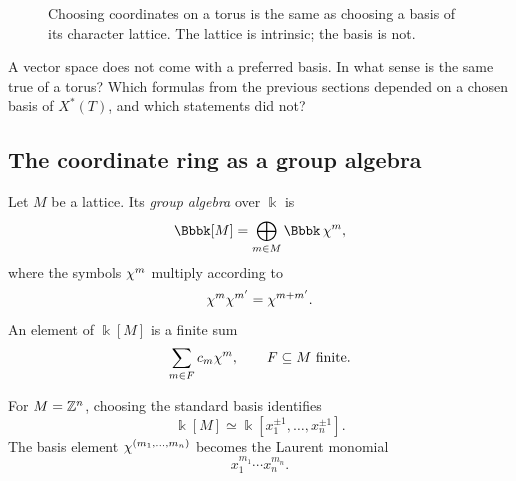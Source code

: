 \begin{figure}[ht]
\centering
{}
\caption{Choosing coordinates on a torus is the same as choosing a
basis of its character lattice. The lattice is intrinsic; the basis is
not.}
\label{fig:coordinates-basis-character-lattice}
\end{figure}

\begin{pauseandthink}
A vector space does not come with a preferred basis. In what sense is
the same true of a torus? Which formulas from the previous sections
depended on a chosen basis of \(X^*(T)\), and which statements did
not?
\end{pauseandthink}

\subsection{The coordinate ring as a group algebra}

Let \(M\) be a lattice. Its \emph{group algebra} over \(\Bbbk\) is
\[
\Bbbk[M]
=
\bigoplus_{m\in M}\Bbbk\,\character{m},
\]
where the symbols \(\chi^{m}\) multiply according to
\[
\chi^{m}\chi^{m'}
=
\chi^{m+m'}.
\]
An element of \(\Bbbk[M]\) is a finite sum
\[
\sum_{m\in F} c_m\chi^{m},
\qquad
F\subseteq M\text{ finite}.
\]

For \(M=\mathbb{Z}^n\), choosing the standard basis identifies
\[
\Bbbk[M]
\simeq
\Bbbk[x_1^{\pm1},\ldots,x_n^{\pm1}].
\]
The basis element \(\chi^{(m_1,\ldots,m_n)}\) becomes the Laurent
monomial
\[
x_1^{m_1}\cdots x_n^{m_n}.
\]

